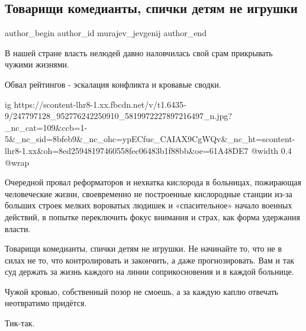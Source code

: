  
 
 
 
 
 
\subsection{Товарищи комедианты, спички детям не игрушки}
\label{sec:26_10_2021.fb.murajev_jevgenij.1.komedianty_vlast}
 
\ifcmt
 author_begin
   author_id murajev_jevgenij
 author_end
\fi

В нашей стране власть нелюдей давно наловчилась свой срам прикрывать чужими
жизнями. 

Обвал рейтингов -  эскалация конфликта и кровавые сводки. 

\ifcmt
  ig https://scontent-lhr8-1.xx.fbcdn.net/v/t1.6435-9/247797128_952776242250910_5819972227897216497_n.jpg?_nc_cat=109&ccb=1-5&_nc_sid=8bfeb9&_nc_ohc=ypECfuc_CAIAX9CgWQv&_nc_ht=scontent-lhr8-1.xx&oh=8ed25948197460558fec06483b1f88bb&oe=61A48DE7
  @width 0.4
  @wrap 
\fi

Очередной провал реформаторов и нехватка кислорода в больницах, пожирающая
человеческие жизни, своевременно не построенные кислородные станции из-за
больших строек мелких вороватых людишек и «спасительное» начало военных
действий, в попытке переключить фокус внимания и страх, как форма удержания
власти. 

Товарищи комедианты, спички детям не игрушки. Не начинайте то, что не в силах
не то, что контролировать и закончить, а даже прогнозировать. Вам и так суд
держать за жизнь каждого на линии соприкосновения и в каждой больнице. 

Чужой кровью, собственный позор не смоешь, а за каждую каплю отвечать
неотвратимо придётся.

Тик-так.

